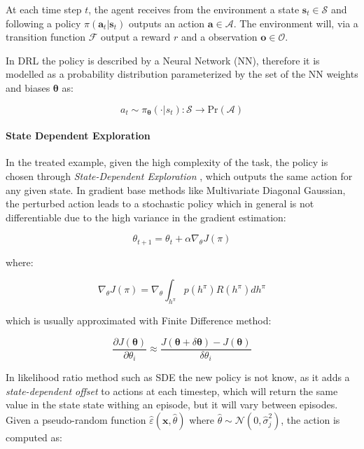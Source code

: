 At each time step $t$, the agent receives from the environment a state $\mathbf{s}_t \in \mathcal{S}$ and following a policy $\pi (\mathbf{a}_t | \mathbf{s}_t)$ outputs an action $\mathbf{a} \in \mathcal{A}$. The environment will, via a transition function $\mathcal{F}$ output a reward $r$ and a observation $\mathbf{o} \in \mathcal{O}$.

In \ac{DRL} the policy is described by a Neural Network (\ac{NN}), therefore it is modelled as a probability distribution parameterized by the set of the \ac{NN} weights and biases $\boldsymbol{\theta}$ as:

\begin{equation}
    a _t \sim \pi _{\boldsymbol{\theta}}(\cdot | s_t): \mathcal{S} \rightarrow \mathrm{Pr}(\mathcal{A})
\end{equation}

\paragraph{State Dependent Exploration} In the treated example, given the high complexity of the task, the policy is chosen through \textit{State-Dependent Exploration} \cite{daelemans_state-dependent_2008} \cite{raffin_smooth_2021}, which outputs the same action for any given state. In gradient base methods like Multivariate Diagonal Gaussian, the perturbed action leads to a stochastic policy which in general is not differentiable due to the high variance in the gradient estimation:

\begin{equation}
    \theta _{t+1} = \theta _t + \alpha \nabla _{\theta} J(\pi)
\end{equation}

where:

\begin{equation}
    \nabla _{\theta} J(\pi) = \nabla _{\theta} \int _{h ^{\pi}} p(h ^{\pi})R(h ^{\pi})dh ^{\pi}
\end{equation}

which is usually approximated with Finite Difference method:

\begin{equation}
    \label{eqn:finitediff}
    \frac{\partial J(\boldsymbol{\theta})}{\partial \theta _i} \approx \frac{J(\boldsymbol{\theta} + \delta \boldsymbol{\theta}) - J(\boldsymbol{\theta})}{\delta \theta _i}
\end{equation}

In likelihood ratio method such as \ac{SDE} the new policy is not know, as it adds a \textit{state-dependent offset} to actions at each timestep, which will return the same value in the state state withing an episode, but it will vary between episodes. Given a pseudo-random function $\hat{\varepsilon}(\mathbf{x}, \hat{\theta})$ where $\hat{\theta} \sim \mathcal{N}(0, \hat{\sigma} _j ^2)$, the action is computed as:

